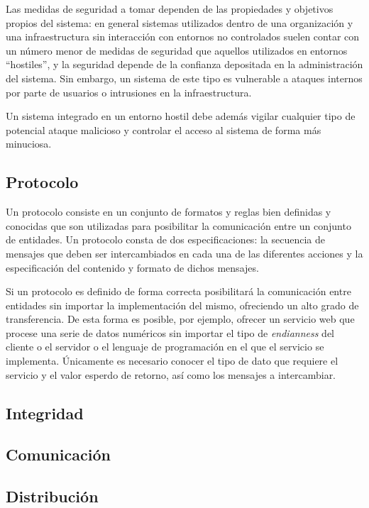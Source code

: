 Las medidas de seguridad a tomar dependen de las propiedades y objetivos propios del sistema: en general sistemas utilizados dentro de una organización y una infraestructura sin interacción con entornos no controlados suelen contar con un número menor de medidas de seguridad que aquellos utilizados en entornos ``hostiles'', y la seguridad depende de la confianza depositada en la administración del sistema. Sin embargo, un sistema de este tipo es vulnerable a ataques internos por parte de usuarios o intrusiones en la infraestructura.

Un sistema integrado en un entorno hostil debe además vigilar cualquier tipo de potencial ataque malicioso y controlar el acceso al sistema de forma más minuciosa.

\subsection{Protocolo}

Un protocolo consiste en un conjunto de formatos y reglas bien definidas y conocidas que son utilizadas para posibilitar la comunicación entre un conjunto de entidades. Un protocolo consta de dos especificaciones: la secuencia de mensajes que deben ser intercambiados en cada una de las diferentes acciones y la especificación del contenido y formato de dichos mensajes.

Si un protocolo es definido de forma correcta posibilitará la comunicación entre entidades sin importar la implementación del mismo, ofreciendo un alto grado de transferencia. De esta forma es posible, por ejemplo, ofrecer un servicio web que procese una serie de datos numéricos sin importar el tipo de \textit{endianness} del cliente o el servidor o el lenguaje de programación en el que el servicio se implementa. Únicamente es necesario conocer el tipo de dato que requiere el servicio y el valor esperdo de retorno, así como los mensajes a intercambiar.

\subsection{Integridad}

\subsection{Comunicación}

\subsection{Distribución}

